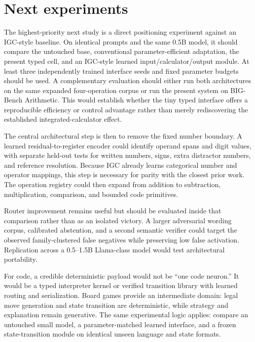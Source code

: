 \documentclass[11pt]{article}
\begin{document}
\section{Next experiments}

The highest-priority next study is a direct positioning experiment against an
IGC-style baseline. On identical prompts and the same 0.5B model, it should
compare the untouched base, conventional parameter-efficient adaptation, the
present typed cell, and an IGC-style learned input/calculator/output module.
At least three independently trained interface seeds and fixed parameter
budgets should be used. A complementary evaluation should either run both
architectures on the same expanded four-operation corpus or run the present
system on BIG-Bench Arithmetic. This would establish whether the tiny typed
interface offers a reproducible efficiency or control advantage rather than
merely rediscovering the established integrated-calculator effect.

The central architectural step is then to remove the fixed number boundary.
A learned residual-to-register encoder could identify operand spans and digit
values, with separate held-out tests for written numbers, signs, extra
distractor numbers, and reference resolution. Because IGC already learns
categorical number and operator mappings, this step is necessary for parity
with the closest prior work. The operation registry could then expand from
addition to subtraction, multiplication, comparison, and bounded code
primitives.

Router improvement remains useful but should be evaluated inside that
comparison rather than as an isolated victory. A larger adversarial wording
corpus, calibrated abstention, and a second semantic verifier could target the
observed family-clustered false negatives while preserving low false
activation. Replication across a 0.5--1.5B Llama-class model would test
architectural portability.

For code, a credible deterministic payload would not be ``one code neuron.''
It would be a typed interpreter kernel or verified transition library with
learned routing and serialization. Board games provide an intermediate domain:
legal move generation and state transition are deterministic, while strategy
and explanation remain generative. The same experimental logic applies:
compare an untouched small model, a parameter-matched learned interface, and a
frozen state-transition module on identical unseen language and state formats.
\end{document}
